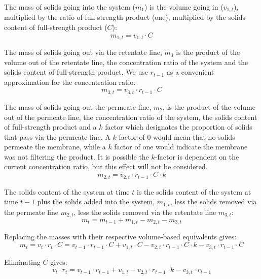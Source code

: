 \documentclass{article}
\begin{document}
The mass of solids going into the system ($m_1$) is the volume going in ($v_{1,t}$), multiplied by the ratio of full-strength product (one), multiplied by the solids content of full-strength product ($C$):
\begin{equation}
  m_{1,t} = v_{1,t}  \cdot C
\end{equation}

The mass of solids going out via the retentate line, $m_3$ is the product of the volume out of the retentate line, the concentration ratio of the system and the solids content of full-strength product.  We use $r_{t-1}$ as a convenient   approximation for the concentration ratio.
\begin{equation}
  m_{3,t} = v_{3,t}  \cdot r_{t-1} \cdot C
\end{equation}

The mass of solids going out the permeate line, $m_2$, is the product of the volume out of the permeate line, the concentration ratio of the system, the solids content of full-strength product and a $k$ factor which designates the proportion of solids that pass via the permeate line.  A $k$ factor of 0 would mean that no solids permeate the membrane, while a $k$ factor of one would indicate the membrane was not filtering the product.  It is possible the $k$-factor is dependent on the current concentration ratio, but this effect will not be considered.
\begin{equation}
  m_{2,t} = v_{2,t}  \cdot r_{t-1} \cdot C \cdot k
\end{equation}

The solids content of the system at time $t$ is the solids content of the system at time $t-1$ plus the solids added into the system, $m_{1,t}$, less the solids removed via the permeate line $m_{2,t}$, less the solids removed via the retentate line $m_{3,t}$:
\begin{equation}
  m_t = m_{t-1} + m_{1,t} - m_{2,t} - m_{3,t}
\end{equation}

Replacing the masses with their respective volume-based equivalents gives:
\begin{equation}
  m_t = v_t \cdot r_t \cdot C
  	= v_{t-1} \cdot r_{t-1} \cdot C 
   	+ v_{1,t}  \cdot C
	- v_{2,t}  \cdot r_{t-1} \cdot C \cdot k
	- v_{3,t}  \cdot r_{t-1} \cdot C
\end{equation}

Eliminating $C$ gives:
\begin{equation}
  v_t \cdot r_t
  	= v_{t-1} \cdot r_{t-1}
   	+ v_{1,t}
	- v_{2,t}  \cdot r_{t-1} \cdot k
	- v_{3,t}  \cdot r_{t-1}
\end{equation}
\end{document}
